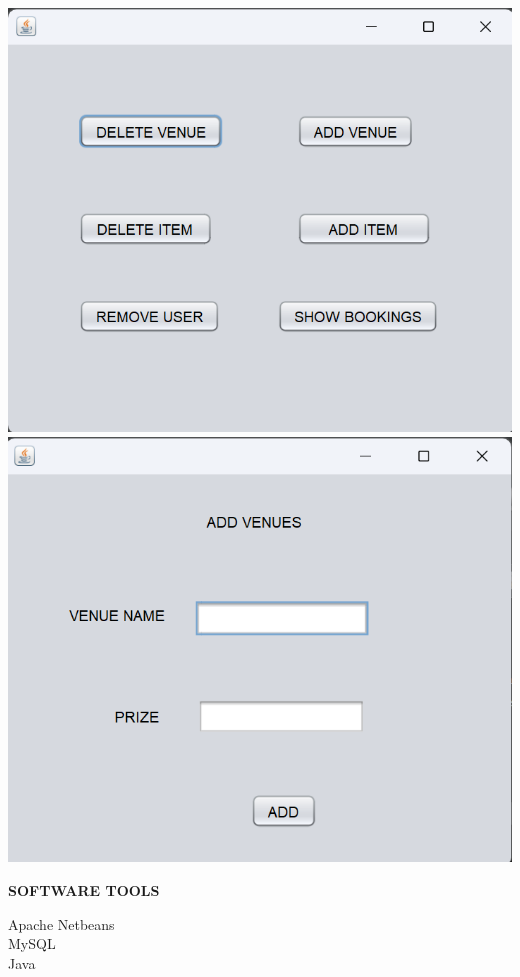 \documentclass[a4paper,12pt]{report}
\begin{document}
\includegraphics[scale=0.5]{ADMIN_PAGE.png}
\includegraphics[scale=0.5]{ADD_VENUES.png}
\newline
\begin{flushleft}
		\textbf{SOFTWARE TOOLS} 
\end{flushleft} 
Apache Netbeans\\
MySQL\\
Java\\
\end{document}
